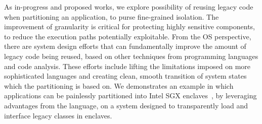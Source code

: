As in-progress and proposed works,
we explore possibility of reusing legacy code when partitioning an application,
to purse fine-grained isolation.
The improvement of granularity is critical for protecting highly sensitive components,
to reduce the execution paths
potentially exploitable.
From the OS perspective,
there are system design efforts that
can fundamentally improve the amount of legacy code being reused,
based on other techniques from programming languages and code analysis.
These efforts include
lifting the limitations imposed on more sophisticated languages
and creating clean, smooth transition of system states
which the partitioning is based on.
We demonstrates an example
in which applications can be painlessly partitioned
into Intel SGX enclaves~\citep{intelsgx},
by leveraging advantages from the \java{} language,
on a system designed to transparently load and interface legacy \java{} classes in enclaves.








